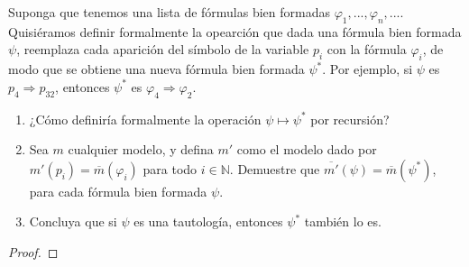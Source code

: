 \documentclass[12pt]{report}
\theoremstyle{largebreak}
\begin{document}
    \begin{excer}
        Suponga que tenemos una lista de fórmulas bien formadas $\varphi_1,...,\varphi_n,...$. Quisiéramos definir formalmente la opearción que dada una fórmula bien formada $\psi$, reemplaza cada aparición del símbolo de la variable $p_i$ con la fórmula $\varphi_i$, de modo que se obtiene una nueva fórmula bien formada $\psi^*$. Por ejemplo, si $\psi$ es $p_4\Rightarrow p_{ 32}$, entonces $\psi^*$ es $\varphi_4\Rightarrow\varphi_{ 2}$.
        \begin{enumerate}
            \item ¿Cómo definiría formalmente la operación $\psi\mapsto\psi^*$ por recursión?
            \item Sea $m$ cualquier modelo, y defina $m'$ como el modelo dado por $m'(p_i)=\overline{m}(\varphi_i)$ para todo $i\in\mathbb{N}$. Demuestre que $\overline{m'}(\psi)=\overline{m}(\psi^*)$, para cada fórmula bien formada $\psi$.
            \item Concluya que si $\psi$ es una tautología, entonces $\psi^*$ también lo es.
        \end{enumerate}
    \end{excer}

    \begin{proof}
    \end{proof}
\end{document}
